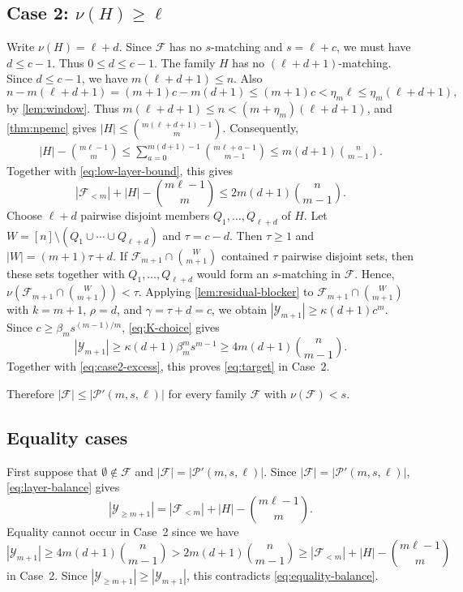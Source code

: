 \documentclass[10pt,a4paper]{article}
\numberwithin{equation}{section}
\theoremstyle{definition}
\newcommand{\F}{\mathcal F}
\newcommand{\Y}{\mathcal Y}
\begin{document}
\subsection{Case 2: $\nu(H)\ge\ell$}

Write $\nu(H)=\ell+d$.
Since $\F$ has no $s$-matching and $s=\ell+c$, we must have $d\le c-1$.
Thus $0\le d\le c-1$.
The family $H$ has no $(\ell+d+1)$-matching.
Since $d\le c-1$, we have $m(\ell+d+1)\le n$.
Also
\[
        n-m(\ell+d+1)=(m+1)c-m(d+1)
        \le(m+1)c
        <\eta_m\ell
        \le\eta_m(\ell+d+1),
\]
by \cref{lem:window}.
Thus $m(\ell+d+1)\le n<(m+\eta_m)(\ell+d+1)$, and \cref{thm:npemc} gives $|H|\le\binom{m(\ell+d+1)-1}{m}$.
Consequently,
\[
        \begin{aligned}
                |H|-\binom{m\ell-1}{m}\le
                \sum_{a=0}^{m(d+1)-1}\binom{m\ell+a-1}{m-1}\le
                m(d+1)\binom n{m-1}.
        \end{aligned}
\]
Together with \eqref{eq:low-layer-bound}, this gives
\begin{equation}\label{eq:case2-excess}
        |\F_{<m}|+|H|-\binom{m\ell-1}{m}
        \le
        2m(d+1)\binom n{m-1}.
\end{equation}
Choose $\ell+d$ pairwise disjoint members $Q_1,\ldots,Q_{\ell+d}$ of $H$.
Let $W=[n]\setminus(Q_1\cup\cdots\cup Q_{\ell+d})$ and $\tau=c-d$.
Then $\tau\ge1$ and $|W|=(m+1)\tau+d$.
If $\F_{m+1}\cap\binom W{m+1}$ contained $\tau$ pairwise disjoint sets, then these sets together with $Q_1,\ldots,Q_{\ell+d}$ would form an $s$-matching in $\F$.
Hence, $\nu(\F_{m+1}\cap\binom W{m+1})<\tau$.
Applying \cref{lem:residual-blocker} to $\F_{m+1}\cap\binom W{m+1}$ with $k=m+1$, $\rho=d$, and $\gamma=\tau+d=c$, we obtain $|\Y_{m+1}|\ge\kappa(d+1)c^m$.
Since $c\ge \beta_m s^{(m-1)/m}$, \eqref{eq:K-choice} gives
\[
        |\Y_{m+1}|
        \ge
        \kappa(d+1)\beta_m^m s^{m-1}
        \ge
        4m(d+1)\binom n{m-1}.
\]
Together with \eqref{eq:case2-excess}, this proves \eqref{eq:target} in Case~2.

Therefore $|\F|\le |\mathcal P'(m,s,\ell)|$ for every family $\F$ with $\nu(\F)<s$.

\subsection{Equality cases}
First suppose that $\emptyset\notin\F$ and $|\F|=|\mathcal P'(m,s,\ell)|$.
Since $|\F|=|\mathcal P'(m,s,\ell)|$, \eqref{eq:layer-balance} gives
\begin{equation}\label{eq:equality-balance}
        |\Y_{\ge m+1}|
        =
        |\F_{<m}|+|H|-\binom{m\ell-1}{m}.
\end{equation}
Equality cannot occur in Case~2 since we have
\[
        |\Y_{m+1}|
        \ge
        4m(d+1)\binom n{m-1}
        >
        2m(d+1)\binom n{m-1}
        \ge
        |\F_{<m}|+|H|-\binom{m\ell-1}{m}
\]
in Case~2.
Since $|\Y_{\ge m+1}|\ge |\Y_{m+1}|$, this contradicts \eqref{eq:equality-balance}.
\end{document}
